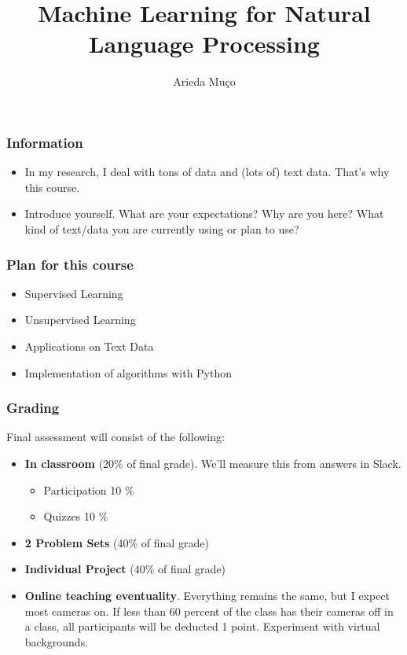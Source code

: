 \documentclass[compress, aspectratio=54]{beamer}
\title[Introduction]{Machine Learning for Natural Language Processing}
\author[Arieda Mu\c co]{Arieda Mu\c co}
\institute[CEU]{Central European University}
\date{}
\begin{document}
\captionsetup[subfigure]{labelformat=empty}

\frame{\titlepage}



\begin{frame}
\frametitle{Information}
\begin{itemize}
\item In my research, I deal with tons of data and (lots of) text data. That's why this course.
\item Introduce yourself. What are your expectations? Why are you here? What kind of text/data you are currently using or plan to use? 
\end{itemize}
\end{frame}

\begin{frame}
\frametitle{Plan for this course}
\begin{itemize}
\item Supervised Learning
\item Unsupervised Learning
\item Applications on Text Data

\item Implementation of algorithms with Python
\end{itemize}
\end{frame}






\begin{frame}
\frametitle{Grading}
Final assessment will consist of the following:
\begin{itemize}
\item \textbf{In classroom} (20\% of final grade). We'll measure this from answers in Slack. 
\begin{itemize}
\item Participation 10 \% 
\item Quizzes 10 \%
\end{itemize}

\item \textbf{2 Problem Sets} (40\% of final grade)
\item \textbf{Individual Project}  (40\% of final grade)

\item \textbf{Online teaching eventuality}. Everything remains the same, but I expect most cameras on. If less than 60 percent of the class has their cameras off in a class, all participants will be deducted 1 point. Experiment with virtual backgrounds.

\end{itemize}
\end{frame}
\end{document}
